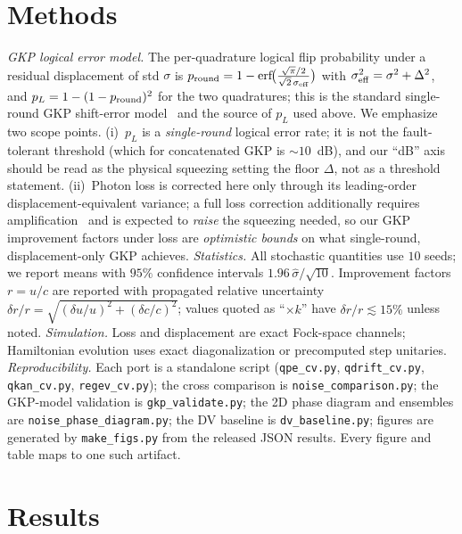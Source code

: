 \documentclass[12pt]{iopart}
\begin{document}
\section{Methods}\label{sec:methods}
\emph{GKP logical error model.} The per-quadrature logical flip probability
under a residual displacement of std $\sigma$ is
$p_{\rm round}=1-\mathrm{erf}\!\big(\frac{\sqrt\pi/2}{\sqrt2\,\sigma_{\rm eff}}\big)$
with $\sigma_{\rm eff}^2=\sigma^2+\Delta^2$, and
$p_L=1-(1-p_{\rm round})^{2}$ for the two quadratures; this is the standard
single-round GKP shift-error model~\cite{GKP2001,Glancy2006} and the source
of $p_L$ used above. We
emphasize two scope points. (i)~$p_L$ is a \emph{single-round} logical error
rate; it is not the fault-tolerant threshold (which for concatenated GKP is
$\sim10$~dB), and our ``dB'' axis should be read as the physical squeezing
setting the floor $\Delta$, not as a threshold statement. (ii)~Photon loss is
corrected here only through its leading-order displacement-equivalent variance;
a full loss correction additionally requires
amplification~\cite{Albert2018,Noh2020,Walshe2020} and is expected to
\emph{raise} the squeezing needed, so our GKP improvement factors under loss
are \emph{optimistic bounds} on what single-round, displacement-only GKP
achieves.
\emph{Statistics.} All stochastic quantities use $10$ seeds; we report means
with $95\%$ confidence intervals $1.96\,\hat\sigma/\sqrt{10}$. Improvement
factors $r=u/c$ are reported with propagated relative uncertainty
$\delta r/r=\sqrt{(\delta u/u)^2+(\delta c/c)^2}$; values quoted as ``$\times k$''
have $\delta r/r\lesssim 15\%$ unless noted.
\emph{Simulation.} Loss and displacement are exact Fock-space channels;
Hamiltonian evolution uses exact diagonalization or precomputed step
unitaries. \emph{Reproducibility.} Each port is a standalone script
(\texttt{qpe\_cv.py}, \texttt{qdrift\_cv.py}, \texttt{qkan\_cv.py},
\texttt{regev\_cv.py}); the cross comparison is \texttt{noise\_comparison.py};
the GKP-model validation is \texttt{gkp\_validate.py}; the 2D phase diagram and
ensembles are \texttt{noise\_phase\_diagram.py}; the DV baseline is
\texttt{dv\_baseline.py}; figures are generated by \texttt{make\_figs.py} from
the released JSON results. Every figure and table maps to one such artifact.

\section{Results}
\end{document}
